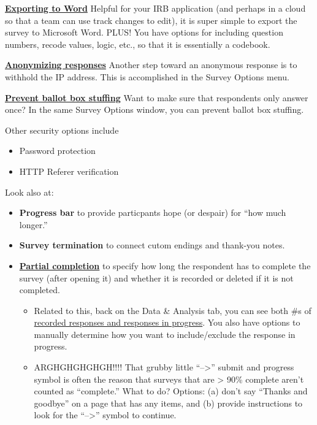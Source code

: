 \documentclass[
  english,
]{book}
\providecommand{\tightlist}{%
  \setlength{\itemsep}{0pt}\setlength{\parskip}{0pt}}
\begin{document}
\href{https://www.qualtrics.com/support/survey-platform/survey-module/survey-tools/import-and-export-surveys/}{\textbf{Exporting to Word}} Helpful for your IRB application (and perhaps in a cloud so that a team can use track changes to edit), it is super simple to export the survey to Microsoft Word. PLUS! You have options for including question numbers, recode values, logic, etc., so that it is essentially a codebook.

\href{https://www.qualtrics.com/support/survey-platform/distributions-module/web-distribution/anonymous-link/}{\textbf{Anonymizing responses}} Another step toward an anonymous response is to withhold the IP address. This is accomplished in the Survey Options menu.

\href{https://www.qualtrics.com/support/survey-platform/survey-module/survey-options/survey-protection/\#PreventingRespondentsFromTakingYourSurveyMoreThanOnce}{\textbf{Prevent ballot box stuffing}} Want to make sure that respondents only answer once? In the same Survey Options window, you can prevent ballot box stuffing.

Other security options include

\begin{itemize}
\tightlist
\item
  Password protection
\item
  HTTP Referer verification
\end{itemize}

Look also at:

\begin{itemize}
\tightlist
\item
  \textbf{Progress bar} to provide particpants hope (or despair) for ``how much longer.''
\item
  \textbf{Survey termination} to connect cutom endings and thank-you notes.
\item
  \href{https://www.qualtrics.com/support/survey-platform/survey-module/survey-options/partial-completion/}{\textbf{Partial completion}} to specify how long the respondent has to complete the survey (after opening it) and whether it is recorded or deleted if it is not completed.

  \begin{itemize}
  \tightlist
  \item
    Related to this, back on the Data \& Analysis tab, you can see both \#s of \href{https://www.qualtrics.com/support/survey-platform/data-and-analysis-module/data/responses-in-progress/}{recorded responses and responses in progress}. You also have options to manually determine how you want to include/exclude the response in progress.
  \item
    ARGHGHGHGHGH!!!! That grubby little ``--\textgreater{}'' submit and progress symbol is often the reason that surveys that are \textgreater{} 90\% complete aren't counted as ``complete.'' What to do? Options: (a) don't say ``Thanks and goodbye'' on a page that has any items, and (b) provide instructions to look for the ``--\textgreater{}'' symbol to continue.
  \end{itemize}
\end{itemize}
\end{document}
